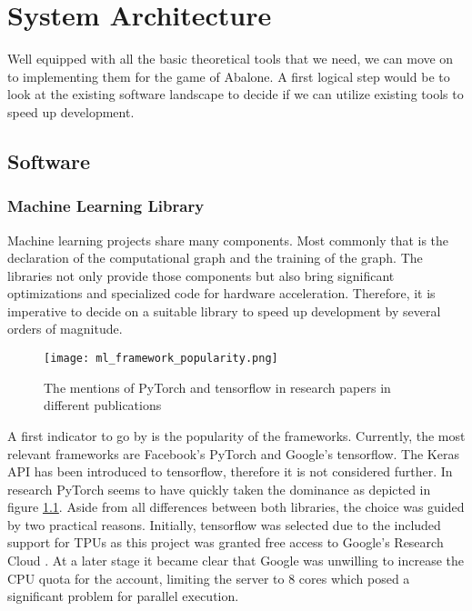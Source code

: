 \chapter{System Architecture}
\label{system-architecture}
Well equipped with all the basic theoretical tools that we need, we can move on to implementing them for the game of Abalone. A first logical step would be to look at the existing software landscape to decide if we can utilize existing tools to speed up development.

\section{Software}
\subsection{Machine Learning Library}
Machine learning projects share many components. Most commonly that is the declaration of the computational graph and the training of the graph. The libraries not only provide those components but also bring significant optimizations and specialized code for hardware acceleration. Therefore, it is imperative to decide on a suitable library to speed up development by several orders of magnitude.

\begin{figure}
    \centering
    \texttt{[image: ml\_framework\_popularity.png]}
    \caption{The mentions of PyTorch and tensorflow in research papers in different publications \cite{noauthor_state_2019}}
    \label{ml_framework_popularity}
\end{figure}

A first indicator to go by is the popularity of the frameworks. Currently, the most relevant frameworks are Facebook's PyTorch and Google's tensorflow. The Keras API has been introduced to tensorflow, therefore it is not considered further. In research PyTorch seems to have quickly taken the dominance as depicted in figure \ref{ml_framework_popularity}. Aside from all differences between both libraries, the choice was guided by two practical reasons. Initially, tensorflow was selected due to the included support for TPUs as this project was granted free access to Google's Research Cloud \cite{noauthor_tpu_nodate}. At a later stage it became clear that Google was unwilling to increase the CPU quota for the account, limiting the server to 8 cores which posed a significant problem for parallel execution.

